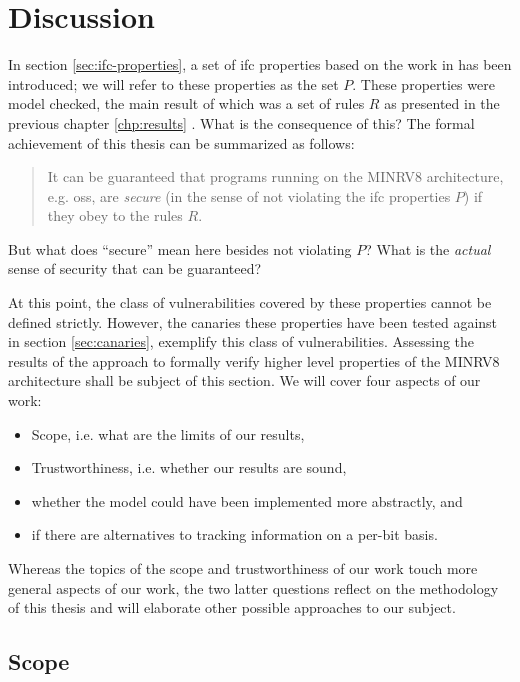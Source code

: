 
\chapter{Discussion}
\label{chp:discussion}

In section \ref{sec:ifc-properties}, a set of \gls{ifc} properties based on the work in \cite{Ferraiuolo17} has been introduced; we will refer to these properties as the set $ P $.
These properties were model checked, the main result of which was a set of rules $ R $ as presented in the previous chapter \ref{chp:results} .
What is the consequence of this?
The formal achievement of this thesis can be summarized as follows:
\begin{quote}
    It can be guaranteed that programs running on the MINRV8 architecture, e.g. \glspl{os}, are \textit{secure} (in the sense of not violating the \gls{ifc} properties $ P $) if they obey to the rules $ R $.
\end{quote}
But what does \enquote{secure} mean here besides not violating $ P $?
What is the \textit{actual} sense of security that can be guaranteed?

At this point, the class of vulnerabilities covered by these properties cannot be defined strictly.
However, the canaries these properties have been tested against in section \ref{sec:canaries}, exemplify this class of vulnerabilities.
Assessing the results of the approach to formally verify higher level properties of the MINRV8 architecture shall be subject of this section.
We will cover four aspects of our work:
\begin{itemize}
    \item Scope, i.e. what are the limits of our results,
    \item Trustworthiness, i.e. whether our results are sound,
    \item whether the model could have been implemented more abstractly, and
    \item if there are alternatives to tracking information on a per-bit basis.
\end{itemize}

Whereas the topics of the scope and trustworthiness of our work touch more general aspects of our work, the two latter questions reflect on the methodology of this thesis and will elaborate other possible approaches to our subject.

\section{Scope}
\label{sec:scope}

